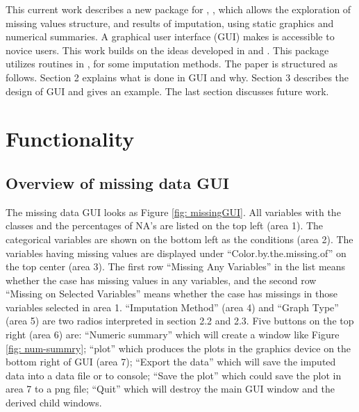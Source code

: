 \documentclass[article]{jss}
\begin{document}
This current work describes a new package for , , which allows the exploration of missing values structure, and results of imputation, using static graphics and numerical summaries. A graphical user interface (GUI) makes is accessible to novice users. This work builds on the ideas developed in \citet{unwin1996interactive} and \citet{swayne1998missing}. This package utilizes routines in  \citep{hmisc},  \citep{norm} for some imputation methods. The paper is structured as follows. Section 2 explains what is done in GUI and why. Section 3 describes the design of GUI and gives an example. The last section discusses future work.

\section{Functionality}

\subsection{Overview of missing data GUI}

The missing data GUI looks as Figure \ref{fig: missingGUI}. All variables with the classes and the percentages of NA's are listed on the top left (area 1). The categorical variables are shown on the bottom left as the conditions (area 2). The variables having missing values are displayed under ``Color.by.the.missing.of'' on the top center (area 3). The first row ``Missing Any Variables'' in the list means whether the case has missing values in any variables, and the second row ``Missing on Selected Variables'' means whether the case has missings in those variables selected in area 1. ``Imputation Method'' (area 4) and ``Graph Type'' (area 5) are two radios interpreted in section 2.2 and 2.3. Five buttons on the top right (area 6) are: ``Numeric summary'' which will create a window like Figure \ref{fig: num-summry}; ``plot'' which produces the plots in the graphics device on the bottom right of GUI (area 7); ``Export the data'' which will save the imputed data into a data file or to  console; ``Save the plot'' which could save the plot in area 7 to a png file; ``Quit'' which will destroy the main GUI window and the derived child windows.
\end{document}

